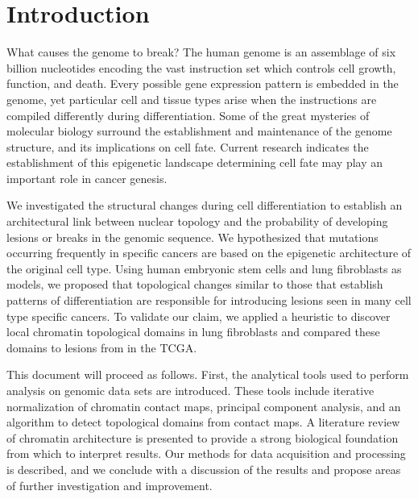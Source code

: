 
\chapter{Introduction}

What causes the genome to break?  The human genome is an assemblage of six billion nucleotides encoding the vast instruction set
which controls cell growth, function, and death.  Every possible gene expression pattern is embedded in the genome, yet particular
cell and tissue types arise when the instructions are compiled differently during differentiation.  Some of the great mysteries
of molecular biology surround the establishment and maintenance of the genome structure, and its implications on cell fate.  
Current research indicates the establishment of this \gls{epigenetic} landscape determining cell fate may play an important
role in cancer genesis.

We investigated the structural changes during cell differentiation to establish an architectural link between
nuclear topology and the probability of developing lesions or breaks in the genomic sequence.  We hypothesized that mutations
occurring frequently in specific cancers are based on the epigenetic architecture of the original cell type.  Using human
embryonic stem cells and lung fibroblasts as models, we proposed that topological changes similar to those that establish
patterns of differentiation are responsible for introducing lesions seen in many cell type specific cancers.  To validate our
claim, we applied a heuristic to discover local chromatin topological domains in lung fibroblasts and compared these
domains to lesions from in the \gls{TCGA}.

This document will proceed as follows.  First, the analytical tools used to perform analysis on genomic data sets are introduced.
These tools include iterative normalization of chromatin contact maps, principal component analysis, and an algorithm to detect
topological domains from contact maps.  A literature review of chromatin architecture is presented to
provide a strong biological foundation from which to interpret results.  Our methods for data acquisition and processing is
described, and we conclude with a discussion of the results and propose areas of further investigation and improvement.
